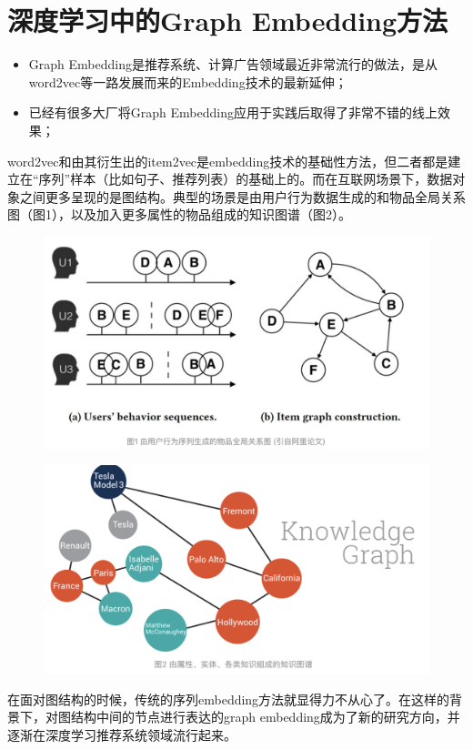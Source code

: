 \documentclass[12pt]{article}
\begin{document}
\section{深度学习中的Graph Embedding方法
\cite{Graph_Embedding_In_Deep_Learning}}
\begin{itemize}
\setlength{\itemsep}{0pt}
\setlength{\parsep}{0pt}
\setlength{\parskip}{0pt}
    \item Graph Embedding是推荐系统、计算广告领域最近非常流行的做法，是从word2vec等一路发展而来的Embedding技术的最新延伸；
    \item 已经有很多大厂将Graph Embedding应用于实践后取得了非常不错的线上效果；
\end{itemize}

word2vec和由其衍生出的item2vec是embedding技术的基础性方法，但二者都是建立在“序列”样本（比如句子、推荐列表）的基础上的。而在互联网场景下，数据对象之间更多呈现的是图结构。典型的场景是由用户行为数据生成的和物品全局关系图（图1），以及加入更多属性的物品组成的知识图谱（图2）。
\begin{figure}[H]
    \centering
    \includegraphics[width=.6\textwidth]{fig/Graph_Embedding_User_Activity_Graph.png}
\end{figure}

\begin{figure}[H]
    \centering
    \includegraphics[width=.6\textwidth]{fig/Graph_Embedding_Knowledge_Graph.png}
\end{figure}

在面对图结构的时候，传统的序列embedding方法就显得力不从心了。在这样的背景下，对图结构中间的节点进行表达的graph embedding成为了新的研究方向，并逐渐在深度学习推荐系统领域流行起来。
\end{document}

